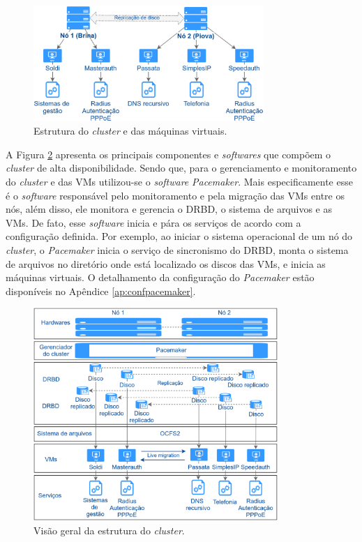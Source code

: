 \begin{figure}[h!]
 \centering
 \includegraphics[width=330px]{img/projeto_vms.eps}
 \caption{Estrutura do \textit{cluster} e das máquinas virtuais.}
 \label{fig:projeto_vms}
\end{figure}

A Figura \ref{fig:projeto_estrutura} apresenta os principais componentes e \textit{softwares} que compõem o \textit{cluster} de alta disponibilidade. 
Sendo que, para o gerenciamento e monitoramento do \textit{cluster} e das \acp{VM} utilizou-se o \textit{software} \textit{Pacemaker}. 
Mais especificamente esse é o \textit{software} responsável pelo monitoramento e pela migração das \acp{VM} entre os nós, além disso, ele 
monitora e gerencia o \ac{DRBD}, o sistema de arquivos e as \acp{VM}. De fato, esse \textit{software} inicia e pára os serviços de acordo 
com a configuração definida. Por exemplo, ao iniciar o sistema operacional de um nó do \textit{cluster}, o \textit{Pacemaker} inicia o serviço 
de sincronismo do \ac{DRBD}, monta o sistema de arquivos no diretório onde está localizado os discos das \acp{VM}, e inicia as máquinas virtuais. 
O detalhamento da configuração do \textit{Pacemaker} estão disponíveis no Apêndice \ref{ap:confpacemaker}.

\begin{figure}[h!]
 \centering
 \includegraphics[width=350px]{img/projeto_estrutura.eps}
 \caption{Visão geral da estrutura do \textit{cluster}.}
 \label{fig:projeto_estrutura}
\end{figure}

